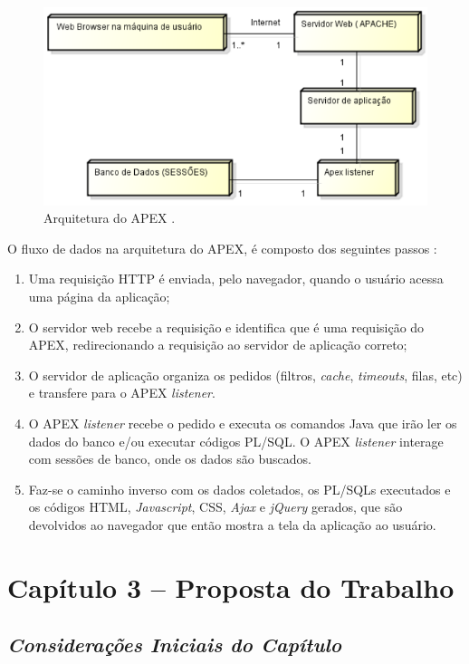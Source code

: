 \begin{figure}[!htb]
	\centering
		\includegraphics[scale=0.6]{figuras/arquitetura_apex}
	\caption{Arquitetura do APEX \cite{ferreira2015}.}
\end{figure}

O fluxo de dados na arquitetura do APEX, é composto dos seguintes passos \cite{ferreira2015}:
\begin{enumerate}
\item Uma requisição HTTP é enviada, pelo navegador, quando o usuário acessa uma página da aplicação;
\item O servidor web recebe a requisição e identifica que é uma requisição do APEX, redirecionando a requisição ao servidor de aplicação correto;
\item O servidor de aplicação organiza os pedidos (filtros, \textit{cache}, \textit{timeouts}, filas, etc) e transfere para o APEX \textit{listener}.
\item O APEX \textit{listener} recebe o pedido e executa os comandos Java que irão ler os dados do banco e/ou executar códigos PL/SQL. O APEX \textit{listener} interage com sessões de banco, onde os dados são buscados.
\item Faz-se o caminho inverso com os dados coletados, os PL/SQLs executados e os códigos HTML, \textit{Javascript}, CSS, \textit{Ajax} e \textit{jQuery} gerados, que são devolvidos ao navegador que então mostra a tela da aplicação ao usuário.
\end{enumerate} 


\chapter[Capítulo 3 – Proposta do Trabalho]{Capítulo 3 – Proposta do Trabalho}

\section{\textit{Considerações Iniciais do Capítulo}}

